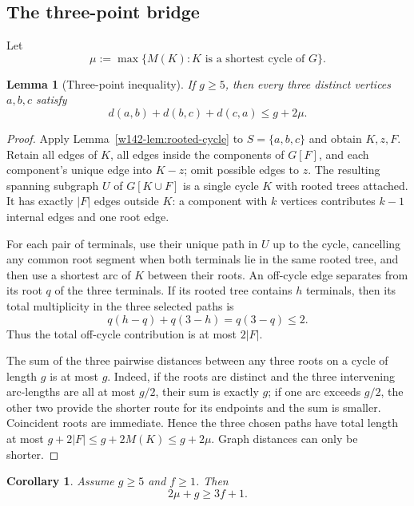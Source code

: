 \documentclass[11pt]{article}
\numberwithin{equation}{section}
\newtheorem{lemma}[theorem]{Lemma}
\newtheorem{corollary}[theorem]{Corollary}
\theoremstyle{remark}
\begin{document}
\subsection{The three-point bridge}

Let
\[
  \mu:=\max\{M(K):K\text{ is a shortest cycle of }G\}.
\]

\begin{lemma}[Three-point inequality]\label{w142-lem:three-point}
If $g\ge5$, then every three distinct vertices $a,b,c$ satisfy
\begin{equation}\label{w142-eq:three-point}
 d(a,b)+d(b,c)+d(c,a)\le g+2\mu.
\end{equation}
\end{lemma}

\begin{proof}
Apply Lemma~\ref{w142-lem:rooted-cycle} to $S=\{a,b,c\}$ and obtain $K,z,F$.
Retain all edges of $K$, all edges inside the components of $G[F]$, and each
component's unique edge into $K-z$; omit possible edges to $z$.  The resulting
spanning subgraph $U$ of $G[K\cup F]$ is a single cycle $K$ with rooted trees
attached.  It has exactly $|F|$ edges outside $K$: a component with $k$
vertices contributes $k-1$ internal edges and one root edge.

For each pair of terminals, use their unique path in $U$ up to the cycle,
cancelling any common root segment when both terminals lie in the same rooted
tree, and then use a shortest arc of $K$ between their roots.  An off-cycle
edge separates from its root $q$ of the three terminals.  If its rooted tree
contains $h$ terminals, then its total multiplicity in the three selected
paths is
\[
  q(h-q)+q(3-h)=q(3-q)\le2.
\]
Thus the total off-cycle contribution is at most $2|F|$.

The sum of the three pairwise distances between any three roots on a cycle of
length $g$ is at most $g$.  Indeed, if the roots are distinct and the three
intervening arc-lengths are all at most $g/2$, their sum is exactly $g$; if
one arc exceeds $g/2$, the other two provide the shorter route for its
endpoints and the sum is smaller.  Coincident roots are immediate.  Hence
the three chosen paths have total length at most
$g+2|F|\le g+2M(K)\le g+2\mu$.  Graph distances can only be shorter.
\end{proof}

\begin{corollary}\label{w142-cor:metric-mu}
Assume $g\ge5$ and $f\ge1$.  Then
\begin{equation}\label{w142-eq:metric-mu}
  2\mu+g\ge3f+1.
\end{equation}
\end{corollary}
\end{document}
